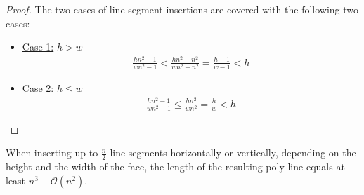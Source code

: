 \begin{proof} The two cases of line segment insertions are covered with the following two cases:
	\begin{itemize}
		\item \underline{Case 1:} $h>w$\\
		\begin{align*}
			\frac{hn^2-1}{wn^2-1} < \frac{hn^2-n^2}{wn^2-n^2} = \frac{h-1}{w-1}< h
		\end{align*}
		\item \underline{Case 2:} $h \leq w$\\
		\begin{align*}
			\frac{hn^2-1}{wn^2-1} \leq \frac{hn^2}{wn^2} = \frac{h}{w} < h
		\end{align*}
	\end{itemize}
\end{proof}
\begin{lemma}
	When inserting up to $\frac{n}{2}$ line segments horizontally or vertically, depending on the height and the width of the face, the length of the resulting poly-line equals at least $n^3 - \mathcal{O}(n^2)$.
\end{lemma}

